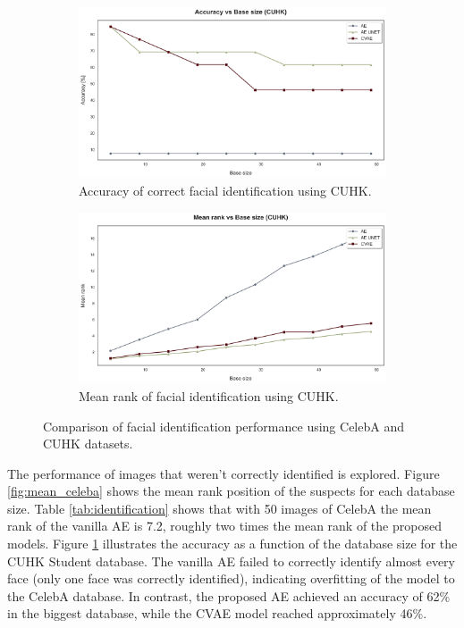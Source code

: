 \documentclass{IEEEcsmag}
\begin{document}
\begin{figure}[ht]
    \begin{subfigure}{0.4\textwidth}
        \centering
        \includegraphics[width=\linewidth]{results/accuracy_vs_base_size_cuhk.png}
        \caption{Accuracy of correct facial identification using CUHK.}
        \label{fig:accuracy_cuhk}
    \end{subfigure}
    \hfill
    \begin{subfigure}{0.4\textwidth}
        \centering
        \includegraphics[width=\linewidth]{results/mean_vs_base_size_cuhk.png}
        \caption{Mean rank of facial identification using CUHK.}
        \label{fig:mean_cuhk}
    \end{subfigure}

    \caption{Comparison of facial identification performance using CelebA and CUHK datasets.}
    \label{fig:face_identification}
\end{figure}

The performance of images that weren't correctly identified is explored. Figure \ref{fig:mean_celeba} shows the mean rank position of the suspects for each database size. Table \ref{tab:identification} shows that with 50 images of CelebA the mean rank of the vanilla AE is 7.2, roughly two times the mean rank of the proposed models. Figure \ref{fig:accuracy_cuhk} illustrates the accuracy as a function of the database size for the CUHK Student database. The vanilla AE failed to correctly identify almost every face (only one face was correctly identified), indicating overfitting of the model to the CelebA database. In contrast, the proposed AE achieved an accuracy of 62\% in the biggest database, while the CVAE model reached approximately 46\%.
\end{document}
